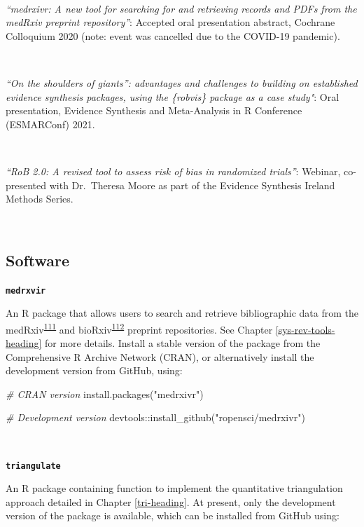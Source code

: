 \documentclass[a4paper, twoside]{templates/ociamthesis}
\newenvironment{Shaded}{\begin{snugshade}}{\end{snugshade}}
\newcommand{\CommentTok}[1]{\textcolor[rgb]{0.56,0.35,0.01}{\textit{#1}}}
\newcommand{\FunctionTok}[1]{\textcolor[rgb]{0.00,0.00,0.00}{#1}}
\newcommand{\NormalTok}[1]{#1}
\newcommand{\SpecialCharTok}[1]{\textcolor[rgb]{0.00,0.00,0.00}{#1}}
\newcommand{\StringTok}[1]{\textcolor[rgb]{0.31,0.60,0.02}{#1}}
\renewenvironment{Shaded}
{
  \vspace{4pt}%
  \begin{snugshade}%
}{%
  \end{snugshade}%
  \vspace{4pt}%
}
\begin{document}
~

\emph{``medrxivr: A new tool for searching for and retrieving records and PDFs from the medRxiv preprint repository''}: Accepted oral presentation abstract, Cochrane Colloquium 2020 (note: event was cancelled due to the COVID-19 pandemic).

~

\emph{``On the shoulders of giants'': advantages and challenges to building on established evidence synthesis packages, using the \{robvis\} package as a case study"}: Oral presentation, Evidence Synthesis and Meta-Analysis in R Conference (ESMARConf) 2021.

~

\emph{``RoB 2.0: A revised tool to assess risk of bias in randomized trials''}: Webinar, co-presented with Dr.~Theresa Moore as part of the Evidence Synthesis Ireland Methods Series.

~

\hypertarget{outputs-software}{%
\subsection{Software}\label{outputs-software}}

\textbf{\texttt{medrxvir}}

An R package that allows users to search and retrieve bibliographic data from the medRxiv\textsuperscript{\protect\hyperlink{ref-rawlinson2019}{111}} and bioRxiv\textsuperscript{\protect\hyperlink{ref-sever2019}{112}} preprint repositories. See Chapter \ref{sys-rev-tools-heading} for more details. Install a stable version of the package from the Comprehensive R Archive Network (CRAN), or alternatively install the development version from GitHub, using:

\begin{Shaded}
\begin{Highlighting}[]
\CommentTok{\# CRAN version}
\FunctionTok{install.packages}\NormalTok{(}\StringTok{"medrxivr"}\NormalTok{)}

\CommentTok{\# Development version}
\NormalTok{devtools}\SpecialCharTok{::}\FunctionTok{install\_github}\NormalTok{(}\StringTok{"ropensci/medrxivr"}\NormalTok{)}
\end{Highlighting}
\end{Shaded}

~

\textbf{\texttt{triangulate}}

An R package containing function to implement the quantitative triangulation approach detailed in Chapter \ref{tri-heading}. At present, only the development version of the package is available, which can be installed from GitHub using:
\end{document}
